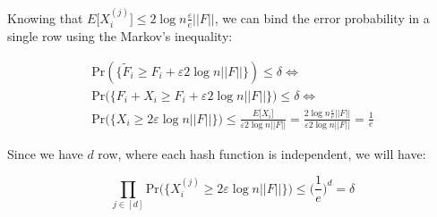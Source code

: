 \documentclass{article}
\begin{document}
\noindent Knowing that $E\big[X_{i}^{(j)}\big] \le 2 \log n \frac{\varepsilon}{e} ||F||$, we can bind the error probability in a single row using the Markov's inequality:

\begin{gather*}
    \textrm{Pr}(\{\tilde{F}_{i} \ge F_{i} + \varepsilon 2 \log n ||F||\}) \le \delta \iff \\
    \textrm{Pr}\bigg(\bigg\{F_{i} + X_{i} \ge F_{i} + \varepsilon 2 \log n ||F|| \bigg\}\bigg) \le \delta \iff \\
    \textrm{Pr}\bigg(\bigg\{X_i \ge 2 \varepsilon \log n ||F||\bigg\}\bigg) \le \frac{E\big[ X_i \big]}{\varepsilon 2 \log n ||F||} = \frac{2\log n \frac{\varepsilon}{e} ||F||}{\varepsilon 2 \log n ||F||} = \frac{1}{e}
\end{gather*}

\noindent Since we have $d$ row, where each hash function is independent, we will have:

\begin{equation*}
    \prod_{j \in [d]} \textrm{Pr}\bigg(\bigg\{ X_{i}^{(j)} \ge 2 \varepsilon \log n ||F||\bigg\}\bigg) \le \bigg(\frac{1}{e}\bigg)^d = \delta
\end{equation*}
\end{document}
